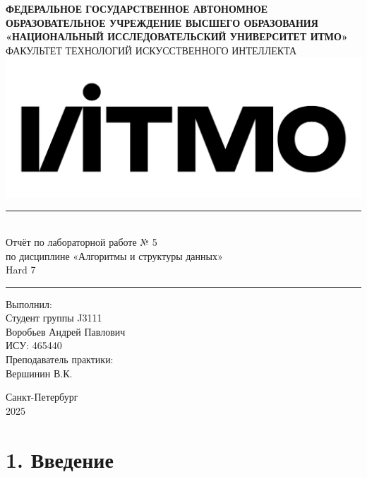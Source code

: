 \documentclass[a4paper,14pt]{extarticle}
\begin{document}
    \thispagestyle{empty}
    \begin{center}
    {\Large\textbf{ФЕДЕРАЛЬНОЕ ГОСУДАРСТВЕННОЕ АВТОНОМНОЕ ОБРАЗОВАТЕЛЬНОЕ УЧРЕЖДЕНИЕ ВЫСШЕГО ОБРАЗОВАНИЯ}}
        \\
        {\Large\textbf{«НАЦИОНАЛЬНЫЙ ИССЛЕДОВАТЕЛЬСКИЙ УНИВЕРСИТЕТ ИТМО»}}\\[5mm]
        {\large ФАКУЛЬТЕТ ТЕХНОЛОГИЙ ИСКУССТВЕННОГО ИНТЕЛЛЕКТА}\\[5mm]
        \includegraphics[scale=0.14]{logo.png}\\[20mm]
        \rule{\textwidth}{0.4mm}\\[3mm]
        {\Large Отчёт по лабораторной работе № 5}\\[3mm]
        {\Large по дисциплине «Алгоритмы и структуры данных»}\\[3mm]
        {\Large Hard 7}\\
        \rule{\textwidth}{0.4mm}
    \end{center}
    \vfill
    \begin{flushright}
        \large Выполнил: \\
        Студент группы J3111 \\
        Воробьев Андрей Павлович \\
        ИСУ: 465440 \\
        Преподаватель практики: \\
        Вершинин В.К.
    \end{flushright}
    \vfill
    \begin{center}
        \large Санкт-Петербург \\
        \large 2025
    \end{center}
    \newpage


    \section*{1. Введение}
\end{document}
